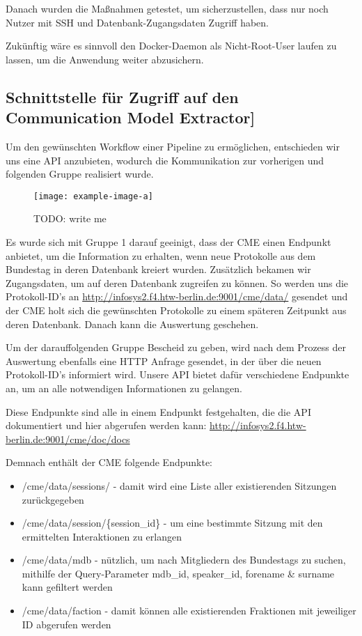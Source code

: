 Danach wurden die Maßnahmen getestet, um sicherzustellen, dass nur noch
Nutzer mit SSH und Datenbank-Zugangsdaten Zugriff haben.

Zukünftig wäre es sinnvoll den Docker-Daemon als Nicht-Root-User laufen zu
lassen, um die Anwendung weiter abzusichern.

\subsection{Schnittstelle für Zugriff auf den Communication Model Extractor]}

Um den gewünschten Workflow einer Pipeline zu ermöglichen, entschieden wir
uns eine API anzubieten, wodurch die Kommunikation zur vorherigen und
folgenden Gruppe realisiert wurde.

\begin{figure}[ht]
    \begin{center}
        \texttt{[image: example-image-a]}
    \end{center}
    \caption{TODO: write me}
    \label{fig:03_api_call_flow}
\end{figure}

Es wurde sich mit Gruppe 1 darauf geeinigt, dass der CME einen Endpunkt
anbietet, um die Information zu erhalten, wenn neue Protokolle aus dem
Bundestag in deren Datenbank kreiert wurden. Zusätzlich bekamen wir
Zugangsdaten, um auf deren Datenbank zugreifen zu können. So werden uns die
Protokoll-ID's an \url{http://infosys2.f4.htw-berlin.de:9001/cme/data/} gesendet
und der CME holt sich die gewünschten Protokolle zu einem späteren Zeitpunkt
aus deren Datenbank. Danach kann die Auswertung geschehen.

Um der darauffolgenden Gruppe Bescheid zu geben, wird nach dem Prozess der
Auswertung ebenfalls eine HTTP Anfrage gesendet, in der über die neuen
Protokoll-ID's informiert wird. Unsere API bietet dafür verschiedene Endpunkte
an, um an alle notwendigen Informationen zu gelangen.

Diese Endpunkte sind alle in einem Endpunkt festgehalten, die die API
dokumentiert und hier abgerufen werden kann:
\url{http://infosys2.f4.htw-berlin.de:9001/cme/doc/docs}

Demnach enthält der CME folgende Endpunkte:
\begin{itemize}
    \item /cme/data/sessions/ - damit wird eine Liste aller existierenden
        Sitzungen zurückgegeben
    \item /cme/data/session/\{session\_id\} - um eine bestimmte Sitzung mit den
        ermittelten Interaktionen zu erlangen
    \item /cme/data/mdb - nützlich, um nach Mitgliedern des Bundestags zu
        suchen, mithilfe der Query-Parameter mdb\_id, speaker\_id, forename
        \& surname kann gefiltert werden
    \item /cme/data/faction - damit können alle existierenden Fraktionen mit
        jeweiliger ID abgerufen werden
\end{itemize}

